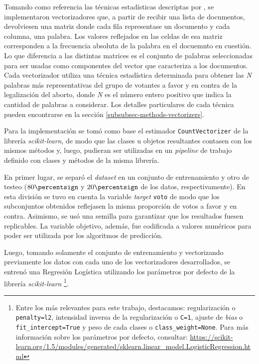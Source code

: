Tomando como referencia las t\'ecnicas estad\'isticas descriptas por
\cite{monroe2008fightin}, se implementaron vectorizadores que, a partir de
recibir una lista de documentos, devolviesen una matriz donde cada fila
representase un documento y cada columna, una palabra. Los valores
reflejados en las celdas de esa matriz corresponden a la frecuencia absoluta
de la palabra en el docuemnto en cuesti\'on. Lo que diferencia a
las distintas matrices es el conjunto de palabras seleccionadas
para ser usadas como componentes del vector
que caracteriza a los documentos. Cada vectorizador utiliza
una t\'ecnica estad\'istica determinada para obtener las \textit{N}
palabras m\'as representativas del grupo de votantes a favor y
en contra de la legalizaci\'on del aborto, donde \textit{N} es el n\'umero
entero positivo que indica la cantidad de palabras a considerar.
Los detalles particulares de cada
t\'ecnica pueden encontrarse en la secci\'on \ref{subsubsec-methods-vectorizers}.
\par
Para la implementaci\'on se tom\'o como base el estimador \texttt{CountVectorizer}
de la librer\'ia \textit{scikit-learn}, de modo que las clases u objetos resultantes
contasen con los mismos m\'etodos y, luego, pudieran ser utilizadas en un
\textit{pipeline}
de trabajo definido con clases y m\'etodos de la misma librer\'ia.
\par
En primer lugar, se separ\'o el \textit{dataset} en un conjunto de entrenamiento
y otro de testeo ($80\percentsign$ y $20\percentsign$ de los datos, respectivamente).
En esta divisi\'on se tuvo en cuenta la variable \textit{target} \texttt{voto} de modo
que los subconjuntos obtenidos reflejasen la misma proporci\'on de votos a favor
y en contra. Asimismo, se us\'o una semilla para garantizar que los resultados
fuesen replicables. La variable objetivo, adem\'as, fue codificada a valores
num\'ericos para poder ser utilizada por los algoritmos de predicci\'on.
\par
Luego, tomando solamente el conjunto de entrenamiento y vectorizando
previamente los datos con cada uno de los vectorizadores desarrollados,
se entren\'o una Regresi\'on Log\'istica utilizando los par\'ametros por defecto
de la librer\'ia \textit{scikit-learn}
\footnote{Entre los m\'as relevantes para este trabajo, destacamos: regularizaci\'on
o \texttt{penalty=l2}, intensidad inversa de la regularizaci\'on o \texttt{C=1},
ajuste de \textit{bias} o \texttt{fit\_intercept=True} y peso de cada clases
o \texttt{class\_weight=None}.
Para m\'as informaci\'on sobre los par\'ametros por defecto, consultar:
\url{https://scikit-learn.org/1.5/modules/generated/sklearn.linear_model.LogisticRegression.html}}.

